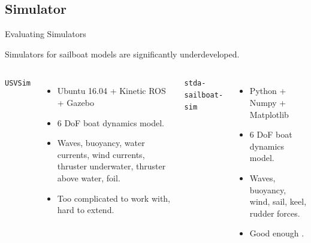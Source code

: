 \documentclass[10pt,xcolor={table,dvipsnames},t]{beamer}
\begin{document}
\subsection{Simulator}
\begin{frame}{Evaluating Simulators}
    
    
    Simulators for sailboat models are significantly underdeveloped.
    
    \begin{columns}
        \centerline{\texttt{USVSim} \cite{Paravisi2019}}
        \begin{itemize}
            \item Ubuntu 16.04 + Kinetic ROS + Gazebo
            \item 6 DoF boat dynamics model.
            \item Waves, buoyancy, water currents, wind currents, thruster underwater, thruster above water, foil.
            \item Too complicated to work with, hard to extend.
        \end{itemize}
        \centerline{\texttt{stda-sailboat-sim} \cite{Buehler2018}}
        \begin{itemize}
            \item Python + Numpy + Matplotlib
            \item 6 DoF boat dynamics model.
            \item Waves, buoyancy, wind, sail, keel, rudder forces.
            \item Good enough .
        \end{itemize}

    \end{columns}
    
\end{frame}



% 
%     
% 

\end{document}
